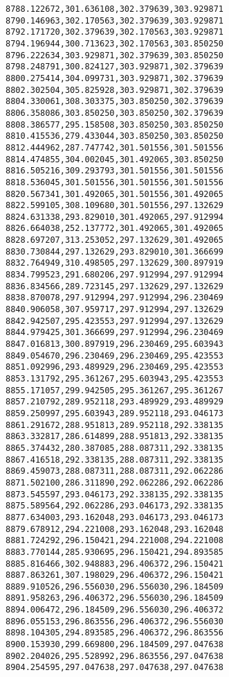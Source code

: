 \documentclass[11pt]{article}
\begin{document}
\begin{Verbatim}[commandchars=\\\{\}]
8788.122672,301.636108,302.379639,303.929871
8790.146963,302.170563,302.379639,303.929871
8792.171720,302.379639,302.170563,303.929871
8794.196944,300.713623,302.170563,303.850250
8796.222634,303.929871,302.379639,303.850250
8798.248791,300.824127,303.929871,302.379639
8800.275414,304.099731,303.929871,302.379639
8802.302504,305.825928,303.929871,302.379639
8804.330061,308.303375,303.850250,302.379639
8806.358086,303.850250,303.850250,302.379639
8808.386577,295.158508,303.850250,303.850250
8810.415536,279.433044,303.850250,303.850250
8812.444962,287.747742,301.501556,301.501556
8814.474855,304.002045,301.492065,303.850250
8816.505216,309.293793,301.501556,301.501556
8818.536045,301.501556,301.501556,301.501556
8820.567341,301.492065,301.501556,301.492065
8822.599105,308.109680,301.501556,297.132629
8824.631338,293.829010,301.492065,297.912994
8826.664038,252.137772,301.492065,301.492065
8828.697207,313.253052,297.132629,301.492065
8830.730844,297.132629,293.829010,301.366699
8832.764949,310.498505,297.132629,300.897919
8834.799523,291.680206,297.912994,297.912994
8836.834566,289.723145,297.132629,297.132629
8838.870078,297.912994,297.912994,296.230469
8840.906058,307.959717,297.912994,297.132629
8842.942507,295.423553,297.912994,297.132629
8844.979425,301.366699,297.912994,296.230469
8847.016813,300.897919,296.230469,295.603943
8849.054670,296.230469,296.230469,295.423553
8851.092996,293.489929,296.230469,295.423553
8853.131792,295.361267,295.603943,295.423553
8855.171057,299.942505,295.361267,295.361267
8857.210792,289.952118,293.489929,293.489929
8859.250997,295.603943,289.952118,293.046173
8861.291672,288.951813,289.952118,292.338135
8863.332817,286.614899,288.951813,292.338135
8865.374432,280.387085,288.087311,292.338135
8867.416518,292.338135,288.087311,292.338135
8869.459073,288.087311,288.087311,292.062286
8871.502100,286.311890,292.062286,292.062286
8873.545597,293.046173,292.338135,292.338135
8875.589564,292.062286,293.046173,292.338135
8877.634003,293.162048,293.046173,293.046173
8879.678912,294.221008,293.162048,293.162048
8881.724292,296.150421,294.221008,294.221008
8883.770144,285.930695,296.150421,294.893585
8885.816466,302.948883,296.406372,296.150421
8887.863261,307.198029,296.406372,296.150421
8889.910526,296.556030,296.556030,296.184509
8891.958263,296.406372,296.556030,296.184509
8894.006472,296.184509,296.556030,296.406372
8896.055153,296.863556,296.406372,296.556030
8898.104305,294.893585,296.406372,296.863556
8900.153930,299.669800,296.184509,297.047638
8902.204026,295.528992,296.863556,297.047638
8904.254595,297.047638,297.047638,297.047638

\end{Verbatim}
\end{document}
